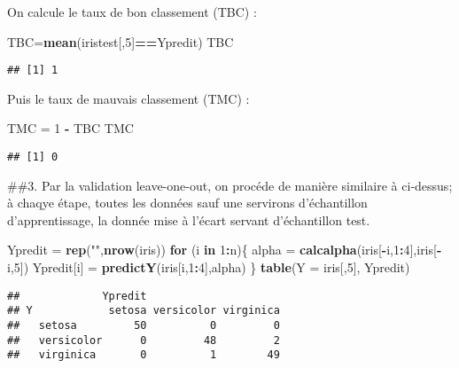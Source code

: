 \documentclass[
]{article}
\newenvironment{Shaded}{\begin{snugshade}}{\end{snugshade}}
\newcommand{\ControlFlowTok}[1]{\textcolor[rgb]{0.13,0.29,0.53}{\textbf{#1}}}
\newcommand{\DataTypeTok}[1]{\textcolor[rgb]{0.13,0.29,0.53}{#1}}
\newcommand{\DecValTok}[1]{\textcolor[rgb]{0.00,0.00,0.81}{#1}}
\newcommand{\KeywordTok}[1]{\textcolor[rgb]{0.13,0.29,0.53}{\textbf{#1}}}
\newcommand{\NormalTok}[1]{#1}
\newcommand{\OperatorTok}[1]{\textcolor[rgb]{0.81,0.36,0.00}{\textbf{#1}}}
\newcommand{\StringTok}[1]{\textcolor[rgb]{0.31,0.60,0.02}{#1}}
\begin{document}
On calcule le taux de bon classement (TBC) :

\begin{Shaded}
\begin{Highlighting}[]
\NormalTok{TBC=}\KeywordTok{mean}\NormalTok{(iristest[,}\DecValTok{5}\NormalTok{]}\OperatorTok{==}\NormalTok{Ypredit)}
\NormalTok{TBC}
\end{Highlighting}
\end{Shaded}

\begin{verbatim}
## [1] 1
\end{verbatim}

Puis le taux de mauvais classement (TMC) :

\begin{Shaded}
\begin{Highlighting}[]
\NormalTok{TMC =}\StringTok{ }\DecValTok{1} \OperatorTok{-}\StringTok{ }\NormalTok{TBC}
\NormalTok{TMC}
\end{Highlighting}
\end{Shaded}

\begin{verbatim}
## [1] 0
\end{verbatim}

\#\#3. Par la validation leave-one-out, on procéde de manière similaire
à ci-dessus; à chaqye étape, toutes les données sauf une servirons
d'échantillon d'apprentissage, la donnée mise à l'écart servant
d'échantillon test.

\begin{Shaded}
\begin{Highlighting}[]
\NormalTok{Ypredit =}\StringTok{ }\KeywordTok{rep}\NormalTok{(}\StringTok{""}\NormalTok{,}\KeywordTok{nrow}\NormalTok{(iris))}
\ControlFlowTok{for}\NormalTok{ (i }\ControlFlowTok{in} \DecValTok{1}\OperatorTok{:}\NormalTok{n)\{}
\NormalTok{  alpha =}\StringTok{ }\KeywordTok{calcalpha}\NormalTok{(iris[}\OperatorTok{-}\NormalTok{i,}\DecValTok{1}\OperatorTok{:}\DecValTok{4}\NormalTok{],iris[}\OperatorTok{-}\NormalTok{i,}\DecValTok{5}\NormalTok{])}
\NormalTok{  Ypredit[i] =}\StringTok{ }\KeywordTok{predictY}\NormalTok{(iris[i,}\DecValTok{1}\OperatorTok{:}\DecValTok{4}\NormalTok{],alpha)}
\NormalTok{\}}
\KeywordTok{table}\NormalTok{(}\DataTypeTok{Y =}\NormalTok{ iris[,}\DecValTok{5}\NormalTok{], Ypredit)}
\end{Highlighting}
\end{Shaded}

\begin{verbatim}
##             Ypredit
## Y            setosa versicolor virginica
##   setosa         50          0         0
##   versicolor      0         48         2
##   virginica       0          1        49
\end{verbatim}
\end{document}
